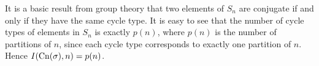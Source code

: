 \documentclass[10pt]{article}
\begin{document}
\begin{enumerate}
\begin{enumerate}
It is a basic result from group theory that two elements of $S_n$ are conjugate if and only if they have the same cycle type.  It is easy to see that the number of cycle types of elements in $S_n$ is exactly $p(n)$, where $p(n)$ is the number of partitions of $n$, since each cycle type corresponds to exactly one partition of $n$.  Hence $I(\operatorname{Cn}(\sigma), n) = p(n)$.

\end{enumerate}


\end{enumerate}
\end{document}
